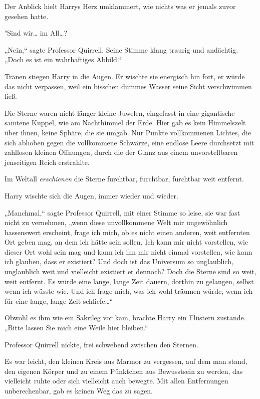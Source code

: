 {Der Anblick hielt Harrys Herz umklammert, wie nichts was er jemals zuvor gesehen hatte.

"Sind wir… im All…?

„Nein,“ sagte Professor Quirrell. Seine Stimme klang traurig und andächtig. „Doch es ist ein wahrhaftiges Abbild.“

Tränen stiegen Harry in die Augen. Er wischte sie energisch hin fort, er würde das nicht verpassen, weil ein bisschen dummes Wasser seine Sicht verschwimmen ließ.

Die Sterne waren nicht länger kleine Juwelen, eingefasst in eine gigantische samtene Kuppel, wie am Nachthimmel der Erde. Hier gab es kein Himmelszelt über ihnen, keine Sphäre, die sie umgab. Nur Punkte vollkommenen Lichtes, die sich abhoben gegen die vollkommene Schwärze, eine endlose Leere durchsetzt mit zahllosen kleinen Öffnungen, durch die der Glanz aus einem unvorstellbaren jenseitigen Reich erstrahlte.

Im Weltall \emph{erschienen} die Sterne furchtbar, furchtbar, furchtbar weit entfernt.

Harry wischte sich die Augen, immer wieder und wieder.

„Manchmal,“ sagte Professor Quirrell, mit einer Stimme so leise, sie war fast nicht zu vernehmen, „wenn diese unvollkommene Welt mir ungewöhnlich hassenswert erscheint, frage ich mich, ob es nicht einen anderen, weit entfernten Ort geben mag, an dem ich hätte sein sollen. Ich kann mir nicht vorstellen, wie dieser Ort wohl sein mag und kann ich ihn mir nicht einmal vorstellen, wie kann ich glauben, dass er existiert? Und doch ist das Universum so unglaublich, unglaublich weit und vielleicht existiert er dennoch? Doch die Sterne sind so weit, weit entfernt. Es würde eine lange, lange Zeit dauern, dorthin zu gelangen, selbst wenn ich wüsste wie. Und ich frage mich, was ich wohl träumen würde, wenn ich für eine lange, lange Zeit schliefe…“

Obwohl es ihm wie ein Sakrileg vor kam, brachte Harry ein Flüstern zustande. „Bitte lassen Sie mich eine Weile hier bleiben.“

Professor Quirrell nickte, frei schwebend zwischen den Sternen.

Es war leicht, den kleinen Kreis aus Marmor zu vergessen, auf dem man stand, den eigenen Körper und zu einem Pünktchen aus Bewusstsein zu werden, das vielleicht ruhte oder sich vielleicht auch bewegte. Mit allen Entfernungen unberechenbar, gab es keinen Weg das zu sagen.

}
